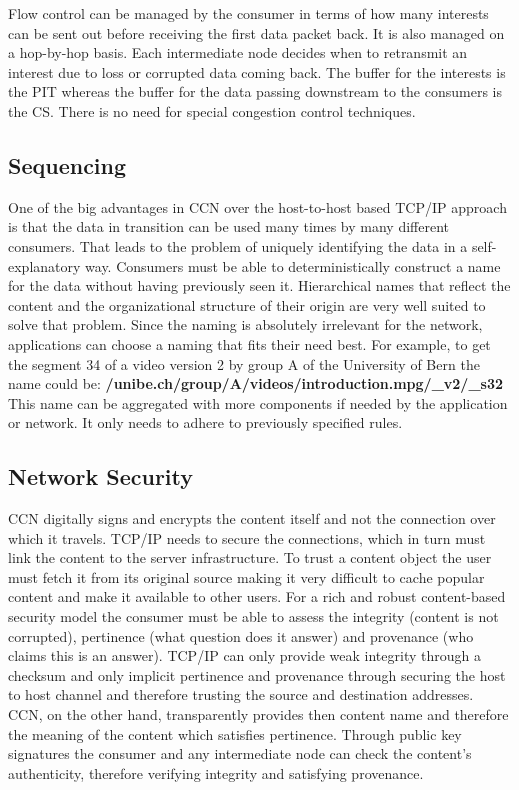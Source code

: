 \vspace{5mm} %

Flow control can be managed by the consumer in terms of how many interests can be sent out before receiving the first data packet back. It is also managed on a hop-by-hop basis. Each intermediate node decides when to retransmit an interest due to loss or corrupted data coming back. The buffer for the interests is the PIT whereas the buffer for the data passing downstream to the consumers is the CS. There is no need for special congestion control techniques.

\subsection{Sequencing}

One of the big advantages in CCN over the host-to-host based TCP/IP approach is that the data in transition can be used many times by many different consumers. That leads to the problem of uniquely identifying the data in a self-explanatory way. Consumers must be able to deterministically construct a name for the data without having previously seen it. Hierarchical names that reflect the content and the organizational structure of their origin are very well suited to solve that problem. Since the naming is absolutely irrelevant for the network, applications can choose a naming that fits their need best. For example, to get the segment 34 of a video version 2 by group A of the University of Bern the name could be: \textbf{/unibe.ch/group/A/videos/introduction.mpg/\_v2/\_s32}\\
This name can be aggregated with more components if needed by the application or network. It only needs to adhere to previously specified rules.

\clearpage


\subsection{Network Security}

CCN digitally signs and encrypts the content itself and not the connection over which it travels. TCP/IP needs to secure the connections, which in turn must link the content to the server infrastructure. To trust a content object the user must fetch it from its original source making it very difficult to cache popular content and make it available to other users. For a rich and robust content-based security model the consumer must be able to assess the integrity (content is not corrupted), pertinence (what question does it answer) and provenance (who claims this is an answer). TCP/IP can only provide weak integrity through a checksum and only implicit pertinence and provenance through securing the host to host channel and therefore trusting the source and destination addresses. CCN, on the other hand, transparently provides then content name and therefore the meaning of the content which satisfies pertinence. Through public key signatures the consumer and any intermediate node can check the content's authenticity, therefore verifying integrity and satisfying provenance.


